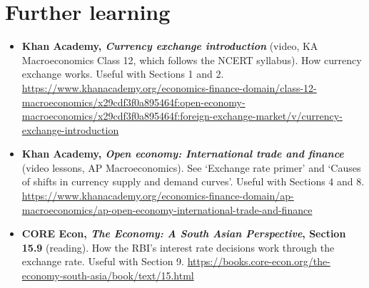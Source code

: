 \section*{Further learning}
\begingroup\small
\begin{itemize}[itemsep=4pt]
  \item \textbf{Khan Academy, \emph{Currency exchange introduction}} (video, KA Macroeconomics Class 12, which follows the NCERT syllabus). How currency exchange works. Useful with Sections 1 and 2. \url{https://www.khanacademy.org/economics-finance-domain/class-12-macroeconomics/x29cdf3f0a895464f:open-economy-macroeconomics/x29cdf3f0a895464f:foreign-exchange-market/v/currency-exchange-introduction}
  \item \textbf{Khan Academy, \emph{Open economy: International trade and finance}} (video lessons, AP Macroeconomics). See `Exchange rate primer' and `Causes of shifts in currency supply and demand curves'. Useful with Sections 4 and 8. \url{https://www.khanacademy.org/economics-finance-domain/ap-macroeconomics/ap-open-economy-international-trade-and-finance}
  \item \textbf{CORE Econ, \emph{The Economy: A South Asian Perspective}, Section 15.9} (reading). How the RBI's interest rate decisions work through the exchange rate. Useful with Section 9. \url{https://books.core-econ.org/the-economy-south-asia/book/text/15.html}
\end{itemize}
\endgroup
